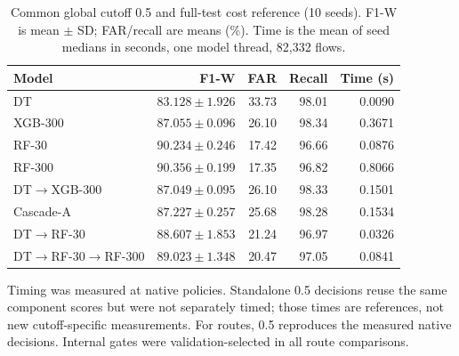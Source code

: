 \begin{table}[!htbp]
\centering
\caption{Common global cutoff 0.5 and full-test cost reference (10 seeds). F1-W is mean $\pm$ SD; FAR/recall are means (\%). Time is the mean of seed medians in seconds, one model thread, 82,332 flows.}
\label{tab:defaultcost}
\small
\setlength{\tabcolsep}{4pt}
\begin{tabularx}{\textwidth}{@{}Xrrrr@{}}
\toprule
Model & F1-W & FAR & Recall & Time (s) \\
\midrule
DT & $83.128\pm1.926$ & 33.73 & 98.01 & 0.0090 \\
XGB-300 & $87.055\pm0.096$ & 26.10 & 98.34 & 0.3671 \\
RF-30 & $90.234\pm0.246$ & 17.42 & 96.66 & 0.0876 \\
RF-300 & $90.356\pm0.199$ & 17.35 & 96.82 & 0.8066 \\
DT$\to$XGB-300 & $87.049\pm0.095$ & 26.10 & 98.33 & 0.1501 \\
Cascade-A & $87.227\pm0.257$ & 25.68 & 98.28 & 0.1534 \\
DT$\to$RF-30 & $88.607\pm1.853$ & 21.24 & 96.97 & 0.0326 \\
DT$\to$RF-30$\to$RF-300 & $89.023\pm1.348$ & 20.47 & 97.05 & 0.0841 \\
\bottomrule
\end{tabularx}
\par\smallskip
\begin{minipage}{\textwidth}\footnotesize Timing was measured at native policies. Standalone 0.5 decisions reuse the same component scores but were not separately timed; those times are references, not new cutoff-specific measurements. For routes, 0.5 reproduces the measured native decisions. Internal gates were validation-selected in all route comparisons.\end{minipage}
\end{table}
